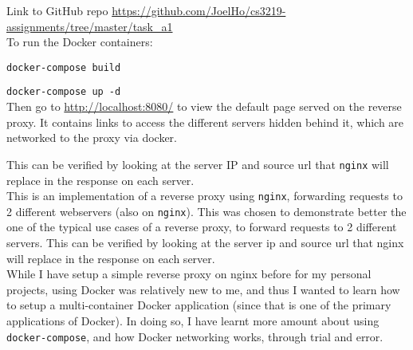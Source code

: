 \documentclass{article}
\begin{document}
    Link to GitHub repo \href{https://github.com/JoelHo/cs3219-assignments/tree/master/task_a1}{https://github.com/JoelHo/cs3219-assignments/tree/master/task\_a1}\\

    To run the Docker containers:

    \texttt{docker-compose build}

    \texttt{docker-compose up -d}\\

    Then go to \href{http://localhost:8080/}{http://localhost:8080/} to view the default page served on the reverse proxy. It contains links to access the different servers hidden behind it, which are networked to the proxy via docker.

    This can be verified by looking at the server IP and source url that \texttt{nginx} will replace in the response on each server.\\

    This is an implementation of a reverse proxy using \texttt{nginx}, forwarding requests to 2 different webservers (also on \texttt{nginx}). This was chosen to demonstrate better the one of the typical use cases of a reverse proxy, to forward requests to 2 different servers.
    This can be verified by looking at the server ip and source url that nginx will replace in the response on each server.\\

    While I have setup a simple reverse proxy on nginx before for my personal projects, using Docker was relatively new to me, and thus I wanted to learn how to setup a multi-container Docker application (since that is one of the primary applications of Docker). In doing so, I have learnt more amount about using \texttt{docker-compose}, and how Docker networking works, through trial and error.
\end{document}
